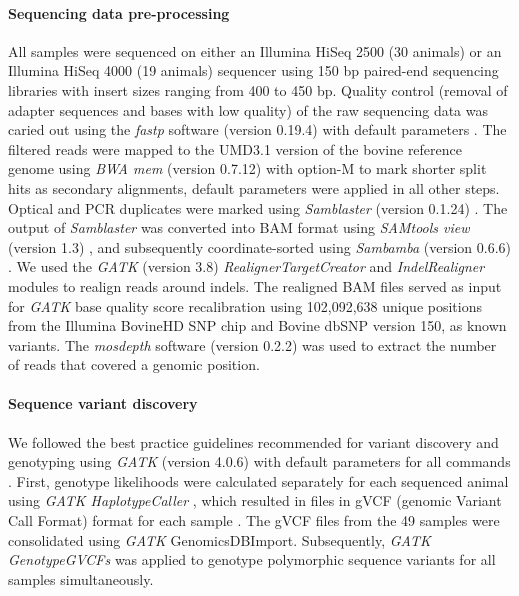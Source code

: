 \documentclass[../main.tex]{subfiles}
\begin{document}
\paragraph{Sequencing data pre-processing}

All samples were sequenced on either an Illumina HiSeq 2500 (30 animals) or an Illumina HiSeq 4000 (19 animals) sequencer using 150 bp paired-end sequencing libraries with insert sizes ranging from 400 to 450 bp. Quality control (removal of adapter sequences and bases with low quality) of the raw sequencing data was caried out using the \emph{fastp} software (version 0.19.4) with default parameters \citep{chen2018fastp}. The filtered reads were mapped to the UMD3.1 version of the bovine reference genome \citep{zimin2009whole} using \emph{BWA mem} (version 0.7.12) \citep{li2009fast} with option-M to mark shorter split hits as secondary alignments, default parameters were applied in all other steps. Optical and PCR duplicates were marked using \emph{Samblaster} (version 0.1.24) \citep{faust2014samblaster}. The output of \emph{Samblaster} was converted into BAM format using \emph{SAMtools view} (version 1.3) \citep{li2009sequence}, and subsequently coordinate-sorted using \emph{Sambamba} (version 0.6.6) \citep{tarasov2015sambamba}. We used the \emph{GATK} (version 3.8) \emph{RealignerTargetCreator} and \emph{IndelRealigner} modules to realign reads around indels. The realigned BAM files served as input for \emph{GATK} base quality score recalibration using 102,092,638 unique positions from the Illumina BovineHD SNP chip and Bovine dbSNP version 150, as known variants. The \emph{mosdepth} software (version 0.2.2) \citep{pedersen2018mosdepth} was used to extract the number of reads that covered a genomic position.

\paragraph{Sequence variant discovery}

We followed the best practice guidelines recommended for variant discovery and genotyping using \emph{GATK} (version 4.0.6) with default parameters for all commands \citep{mckenna2010genome,vander2018best,depristo2011framework}. First, genotype likelihoods were calculated separately for each sequenced animal using \emph{GATK HaplotypeCaller} \citep{vander2018best}, which resulted in files in gVCF (genomic Variant Call Format) format for each sample \citep{danecek2011variant}. The gVCF files from the 49 samples were consolidated using \emph{GATK} GenomicsDBImport. Subsequently, \emph{GATK GenotypeGVCFs} was applied to genotype polymorphic sequence variants for all samples simultaneously.
\end{document}

